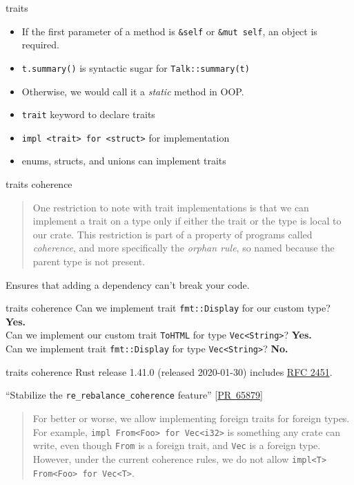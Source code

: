 \documentclass{beamer}
\begin{document}
\begin{frame}[fragile]{traits}
  \begin{itemize}
    \item If the first parameter of a method is \texttt{&self} or \texttt{&mut self}, an object is required.
    \item \texttt{t.summary()} is syntactic sugar for \texttt{Talk::summary(t)}
    \item Otherwise, we would call it a \emph{static} method in OOP.
    \item \texttt{trait} keyword to declare traits
    \item \texttt{impl <trait> for <struct>} for implementation
    \item enums, structs, and unions can implement traits
  \end{itemize}
\end{frame}

\begin{frame}[fragile]{traits coherence}
  \begin{quote}
    One restriction to note with trait implementations is that we can implement a trait on a type only if either the trait or the type is local to our crate.
    This restriction is part of a property of programs called \emph{coherence}, and more specifically the \emph{orphan rule}, so named because the parent type is not present.
  \end{quote}
  Ensures that adding a dependency can't break your code.
\end{frame}

\begin{frame}[fragile]{traits coherence}
  Can we implement trait \texttt{fmt::Display} for our custom type? \textbf{Yes.} \\[15pt]
  Can we implement our custom trait \texttt{ToHTML} for type \texttt{Vec<String>}? \textbf{Yes.} \\[15pt]
  Can we implement trait \texttt{fmt::Display} for type \texttt{Vec<String>}? \textbf{No.}
\end{frame}

\begin{frame}[fragile]{traits coherence}
  Rust release 1.41.0 (released 2020-01-30) includes \href{https://rust-lang.github.io/rfcs/2451-re-rebalancing-coherence.html}{RFC 2451}.

  \enquote{Stabilize the \texttt{re\_rebalance\_coherence} feature} [\href{https://github.com/rust-lang/rust/pull/65879/}{PR~65879}]

  \begin{quote}
    For better or worse, we allow implementing foreign traits for foreign types. For example, \texttt{impl From<Foo> for Vec<i32>} is something any crate can write, even though \texttt{From} is a foreign trait, and \texttt{Vec} is a foreign type. However, under the current coherence rules, we do not allow \texttt{impl<T> From<Foo> for Vec<T>}.
  \end{quote}
\end{frame}
\end{document}
